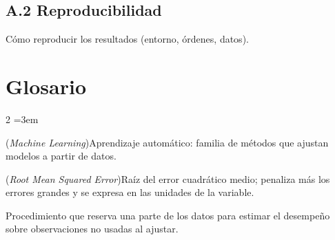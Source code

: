 \documentclass[12pt,letterpaper]{report}
\begin{document}
\section*{A.2 Reproducibilidad}
Cómo reproducir los resultados (entorno, órdenes, datos).

\chapter*{Glosario}
\begin{multicols}{2}
\setlength{\columnsep}{14pt}
\scriptsize
\sloppy
{}
\emergencystretch=3em
\begin{description}[leftmargin=0pt, labelindent=0pt, itemindent=0pt, labelsep=0.4em,
                    font=\bfseries\scriptsize, itemsep=2pt, parsep=0pt, topsep=0pt]
    \item[ML] (\textit{Machine Learning})\hspace{0.3em}Aprendizaje automático: familia de métodos que ajustan modelos a partir de datos.
    \item[RMSE] (\textit{Root Mean Squared Error})\hspace{0.3em}Raíz del error cuadrático medio; penaliza más los errores grandes y se expresa en las unidades de la variable.
    \item[Validación cruzada] Procedimiento que reserva una parte de los datos para estimar el desempeño sobre observaciones no usadas al ajustar.
\end{description}
\end{multicols}
\end{document}
